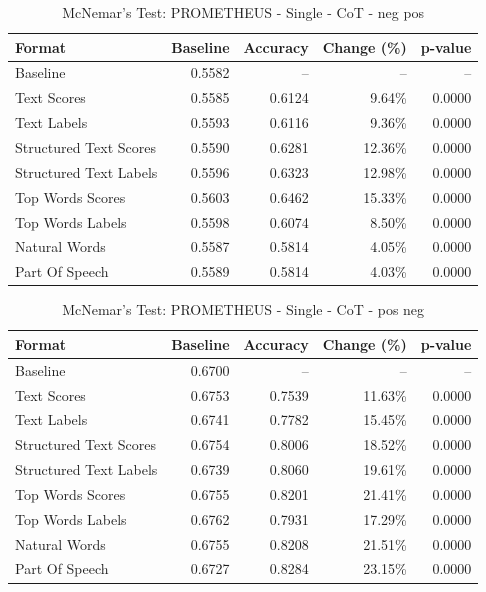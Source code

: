 \begin{table}[htbp]
\centering
\caption{McNemar's Test: PROMETHEUS - Single - CoT - neg pos}
\label{tab:prometheus-single-chain_of_thought_True-neg_pos}
\begin{tabular}{lrrrr}
\toprule
Format & Baseline & Accuracy & Change (\%) & p-value \\
\midrule
Baseline & 0.5582 & -- & -- & -- \\
Text Scores & 0.5585 & 0.6124 & 9.64\% & 0.0000 \\
Text Labels & 0.5593 & 0.6116 & 9.36\% & 0.0000 \\
Structured Text Scores & 0.5590 & 0.6281 & 12.36\% & 0.0000 \\
Structured Text Labels & 0.5596 & 0.6323 & 12.98\% & 0.0000 \\
Top Words Scores & 0.5603 & 0.6462 & 15.33\% & 0.0000 \\
Top Words Labels & 0.5598 & 0.6074 & 8.50\% & 0.0000 \\
Natural Words & 0.5587 & 0.5814 & 4.05\% & 0.0000 \\
Part Of Speech & 0.5589 & 0.5814 & 4.03\% & 0.0000 \\
\bottomrule
\end{tabular}
\end{table}

\begin{table}[htbp]
\centering
\caption{McNemar's Test: PROMETHEUS - Single - CoT - pos neg}
\label{tab:prometheus-single-chain_of_thought_True-pos_neg}
\begin{tabular}{lrrrr}
\toprule
Format & Baseline & Accuracy & Change (\%) & p-value \\
\midrule
Baseline & 0.6700 & -- & -- & -- \\
Text Scores & 0.6753 & 0.7539 & 11.63\% & 0.0000 \\
Text Labels & 0.6741 & 0.7782 & 15.45\% & 0.0000 \\
Structured Text Scores & 0.6754 & 0.8006 & 18.52\% & 0.0000 \\
Structured Text Labels & 0.6739 & 0.8060 & 19.61\% & 0.0000 \\
Top Words Scores & 0.6755 & 0.8201 & 21.41\% & 0.0000 \\
Top Words Labels & 0.6762 & 0.7931 & 17.29\% & 0.0000 \\
Natural Words & 0.6755 & 0.8208 & 21.51\% & 0.0000 \\
Part Of Speech & 0.6727 & 0.8284 & 23.15\% & 0.0000 \\
\bottomrule
\end{tabular}
\end{table}


